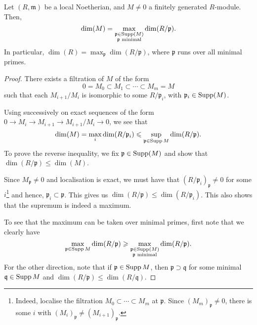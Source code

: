 \documentclass[12pt]{article}
\begin{document}
\begin{thm} \label{thm:dimension-depends-support}
	Let $(R, \mathfrak{m})$ be a local Noetherian, and $M \neq 0$ a finitely generated $R$-module. Then,
	\begin{equation*} 
		\dim(M) = \max_{\substack{\mathfrak{p} \in \operatorname{Supp}(M) \\ \mathfrak{p} \text{ minimal}}} \dim(R/\mathfrak{p}).
	\end{equation*}
	In particular, $\dim(R) = \max_{\mathfrak{p}} \dim(R/\mathfrak{p})$, where $\mathfrak{p}$ runs over all minimal primes.
\end{thm}
\begin{proof} 
	There exists a filtration of $M$ of the form
	\begin{equation*} 
		0 = M_{0} \subset M_{1} \subset \cdots \subset M_{m} = M
	\end{equation*}
	such that each $M_{i + 1}/M_{i}$ is isomorphic to some $R/\mathfrak{p}_{i}$, with $\mathfrak{p}_{i} \in \operatorname{Supp}(M)$. 

	Using  successively on exact sequences of the form $0 \to M_{i} \to M_{i + 1} \to M_{i + 1}/M_{i} \to 0$, we see that
	\begin{equation*} 
		\dim(M) = \max_{i} \dim(R/\mathfrak{p}_{i}) \leqslant \sup_{\mathfrak{p} \in \operatorname{Supp} M} \dim(R/\mathfrak{p}).
	\end{equation*}
	To prove the reverse inequality, we fix $\mathfrak{p} \in \operatorname{Supp}(M)$ and show that $\dim(R/\mathfrak{p}) \le \dim(M)$.

	Since $M_{\mathfrak{p}} \neq 0$ and localisation is exact, we must have that $(R/\mathfrak{p}_{i})_{\mathfrak{p}} \neq 0$ for some $i$\footnote{Indeed, localise the filtration $M_{0} \subset \cdots \subset M_{m}$ at $\mathfrak{p}$. Since $(M_{m})_{\mathfrak{p}} \neq 0$, there is some $i$ with $(M_{i})_{\mathfrak{p}} \neq (M_{i + 1})_{\mathfrak{p}}$.} and hence, $\mathfrak{p}_{i} \subset \mathfrak{p}$. This gives us $\dim(R/\mathfrak{p}) \le \dim(R/\mathfrak{p}_{i})$. \newline
	This also shows that the supremum is indeed a maximum.

	To see that the maximum can be taken over minimal primes, first note that we clearly have
	\begin{equation*} 
		\max_{\mathfrak{p} \in \operatorname{Supp} M} \dim(R/\mathfrak{p}) \geqslant \max_{\substack{\mathfrak{p} \in \operatorname{Supp}(M) \\ \mathfrak{p} \text{ minimal}}} \dim(R/\mathfrak{p}).
	\end{equation*}
	For the other direction, note that if $\mathfrak{p} \in \operatorname{Supp} M$, then $\mathfrak{p} \supset \mathfrak{q}$ for some minimal $\mathfrak{q} \in \operatorname{Supp} M$ and $\dim(R/\mathfrak{p}) \le \dim(R/\mathfrak{q})$.
\end{proof}
\end{document}
